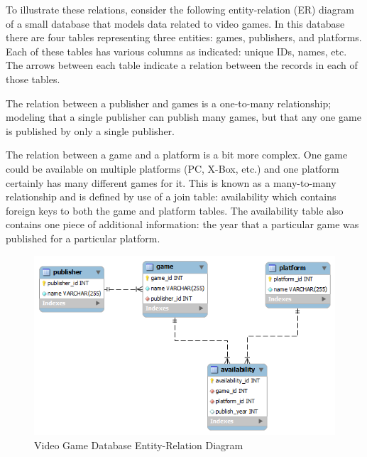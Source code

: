 \documentclass[12pt]{scrartcl}
\begin{document}
To illustrate these relations, consider the following entity-relation 
(ER) diagram of a small database that models data related to 
video games.  In this database there are four tables representing 
three entities: games, publishers, and platforms.  Each of these 
tables has various columns as indicated: unique IDs, names, etc.  
The arrows between each table indicate a relation between the 
records in each of those tables.

The relation between a publisher and games is a one-to-many 
relationship; modeling that a single publisher can publish many 
games, but that any one game is published by only a single 
publisher.

The relation between a game and a platform is a bit more complex.  
One game could be available on multiple platforms (PC, X-Box, etc.) 
and one platform certainly has many different games for it.  This is 
known as a many-to-many relationship and is defined by use of 
a join table: availability which contains foreign keys to both the 
game and platform tables.  The availability table also contains 
one piece of additional information: the year that a particular 
game was published for a particular platform.

\begin{figure}
\centering
\includegraphics[scale=0.75]{videoGameDatabase}
\caption{Video Game Database Entity-Relation Diagram}
\label{figure:videoGameDatabase}
\end{figure}
 
\end{document}
